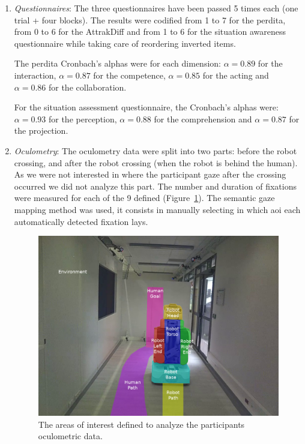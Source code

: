 \documentclass[a4paper,11pt,twoside]{StyleThese}
\begin{document}
\begin{enumerate}
\item \textit{Questionnaires}:
The three questionnaires have been passed 5 times each (one trial + four blocks). The results were codified from 1 to 7 for the \acrshort{perdita}, from 0 to 6 for the AttrakDiff and from 1 to 6 for the situation awareness questionnaire while taking care of reordering inverted items.

The \acrshort{perdita} Cronbach's alphas were for each dimension: $\alpha = 0.89$ for the interaction, $\alpha = 0.87$ for the competence, $\alpha = 0.85$ for the acting and $\alpha = 0.86$ for the collaboration.

For the situation assessment questionnaire, the Cronbach's alphas were: $\alpha = 0.93$ for the perception, $\alpha = 0.88$ for the comprehension and $\alpha = 0.87$ for the projection.

\item \textit{Oculometry}:
The oculometry data were split into two parts: before the robot crossing, and after the robot crossing (when the robot is behind the human). As we were not interested in where the participant gaze after the crossing occurred we did not analyze this part. The number and duration of fixations were measured for each of the 9 defined  (Figure~\ref{fig:aois}). The semantic gaze mapping method was used, it consists in manually selecting in which \acrshort{aoi} each automatically detected fixation lays.

\begin{figure}[hbtp]
\centering
\includegraphics[scale=0.4]{figures/chapter2/pr2_aois_2.png}
\caption{The areas of interest defined to analyze the participants oculometric data.}
\label{fig:aois}
\end{figure}


\end{enumerate}
\end{document}
